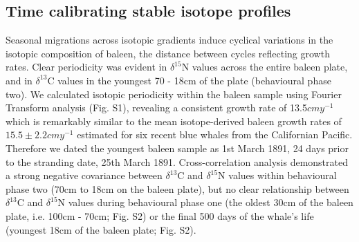 \documentclass[a4paper,12pt]{article}
\begin{document}
\subsection{Time calibrating stable isotope profiles}
Seasonal migrations across isotopic gradients induce cyclical variations in the isotopic composition of baleen, the distance between cycles reflecting growth rates\cite{hobson1998stable,busquets2017estimating}. 
Clear periodicity was evident in $\delta^{15}$N values across the entire baleen plate, and in $\delta^{13}$C values in the youngest 70 - 18cm of the plate (behavioural phase two). 
We calculated isotopic periodicity within the baleen sample using Fourier Transform analysis\cite{cardona2017temporal} (Fig. S1), revealing a consistent growth rate of 13.5$cmy^{-1}$ which is remarkably similar to the mean isotope-derived baleen growth rates of $15.5 \pm 2.2cmy^{-1}$ estimated for six recent blue whales from the Californian Pacific\cite{busquets2017estimating}.  
Therefore we dated the youngest baleen sample as 1st March 1891, 24 days prior to the stranding date, 25th March 1891. 
Cross-correlation analysis demonstrated a strong negative covariance between $\delta^{13}$C and $\delta^{15}$N values within behavioural phase two (70cm to 18cm on the baleen plate), but no clear relationship between $\delta^{13}$C and $\delta^{15}$N values during behavioural phase one (the oldest 30cm of the baleen plate, i.e. 100cm - 70cm; Fig. S2) or the final 500 days of the whale's life (youngest 18cm of the baleen plate; Fig. S2).
 
\end{document}
